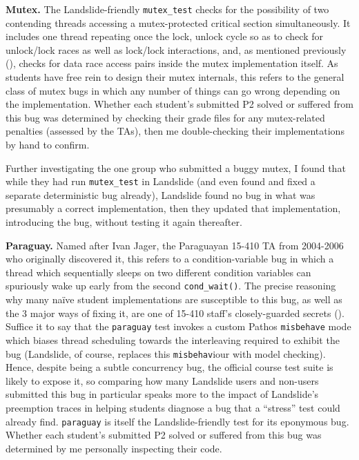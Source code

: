 {\bf Mutex.}
The Landslide-friendly {\tt mutex\_test} checks for the possibility of two contending threads
accessing a mutex-protected critical section simultaneously.
It includes one thread repeating once the lock, unlock cycle
so as to check for unlock/lock races as well as lock/lock interactions,
and, as mentioned previously (\sect{\ref{sec:education-pebbles-tests}}),
checks for data race access pairs inside the mutex implementation itself.
As students have free rein to design their mutex internals,
this refers to the general class of mutex bugs
in which any number of things can go wrong depending on the implementation.
Whether each student's submitted P2 solved or suffered from this bug
was determined by checking their grade files for any mutex-related penalties (assessed by the TAs),
then me double-checking their implementations by hand to confirm.

Further investigating the one group who submitted a buggy mutex,
I found that while they had run {\tt mutex\_test} in Landslide
(and even found and fixed a separate deterministic bug already),
Landslide found no bug in what was presumably a correct implementation,
then they updated %
that implementation, introducing the bug, without testing it again thereafter.

{\bf Paraguay.}
Named after Ivan Jager, the Paraguayan 15-410 TA from 2004-2006 who originally discovered it,
this refers to a condition-variable bug in which a thread which sequentially sleeps on two different condition variables
can spuriously wake up early from the second {\tt cond\_wait()}.
The precise reasoning why many na\"ive student implementations are susceptible to this bug,
as well as the 3 major ways of fixing it,
are one of 15-410 staff's closely-guarded secrets (\sect{\ref{sec:410-secrecy}}).
Suffice it to say that the {\tt paraguay} test invokes a custom Pathos {\tt misbehave} mode
which biases thread scheduling towards the interleaving required to exhibit the bug
(Landslide, of course, replaces this {\tt misbehav}iour with model checking).
Hence, despite being a subtle concurrency bug,
the official course test suite is likely to expose it,
so comparing how many Landslide users and non-users submitted this bug in particular
speaks more to the impact of Landslide's preemption traces
in helping students diagnose a bug that a ``stress'' test could already find.
%
{\tt paraguay} is itself the Landslide-friendly test for its eponymous bug.
Whether each student's submitted P2 solved or suffered from this bug
was determined by me personally inspecting their code.

